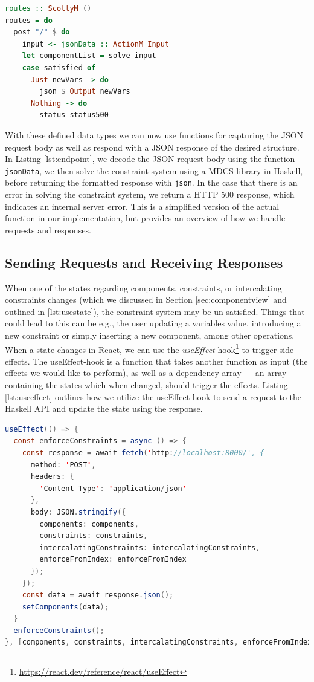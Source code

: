 \documentclass[11pt, a4paper]{article}
\begin{document}
\begin{lstlisting}[language=haskell, caption={Example of an endpoint for the API.}, label={lst:endpoint}]
routes :: ScottyM ()
routes = do
  post "/" $ do
    input <- jsonData :: ActionM Input
    let componentList = solve input
    case satisfied of
      Just newVars -> do
        json $ Output newVars
      Nothing -> do
        status status500
\end{lstlisting}

With these defined data types we can now use functions for capturing the JSON request body as well as respond with a JSON response of the desired structure. In Listing \ref{lst:endpoint}, we decode the JSON request body using the function \texttt{jsonData}, we then solve the constraint system using a MDCS library in Haskell, before returning the formatted response with \texttt{json}. In the case that there is an error in solving the constraint system, we return a HTTP 500 response, which indicates an internal server error. This is a simplified version of the actual function in our implementation, but provides an overview of how we handle requests and responses.

\subsection{Sending Requests and Receiving Responses}
\label{sec:requests}

When one of the states regarding components, constraints, or intercalating constraints changes (which we discussed in Section \ref{sec:componentview} and outlined in \ref{lst:usestate}), the constraint system may be un-satisfied. Things that could lead to this can be e.g., the user updating a variables value, introducing a new constraint or simply inserting a new component, among other operations. When a state changes in React, we can use the \textit{useEffect}-hook\footnote{\url{https://react.dev/reference/react/useEffect}} to trigger side-effects. The useEffect-hook is a function that takes another function as input (the effects we would like to perform), as well as a dependency array --- an array containing the states which when changed, should trigger the effects. Listing \ref{lst:useeffect} outlines how we utilize the useEffect-hook to send a request to the Haskell API and update the state using the response.

\begin{lstlisting}[language=java, caption={useEffect-hook to send a request to the Haskell API and update the state.}, label={lst:useeffect}]
useEffect(() => {
  const enforceConstraints = async () => {
    const response = await fetch('http://localhost:8000/', {
      method: 'POST',
      headers: {
        'Content-Type': 'application/json'
      },
      body: JSON.stringify({
        components: components,
        constraints: constraints,
        intercalatingConstraints: intercalatingConstraints,
        enforceFromIndex: enforceFromIndex
      });
    });
    const data = await response.json();
    setComponents(data);
  }
  enforceConstraints();
}, [components, constraints, intercalatingConstraints, enforceFromIndex]);
\end{lstlisting}
\end{document}
